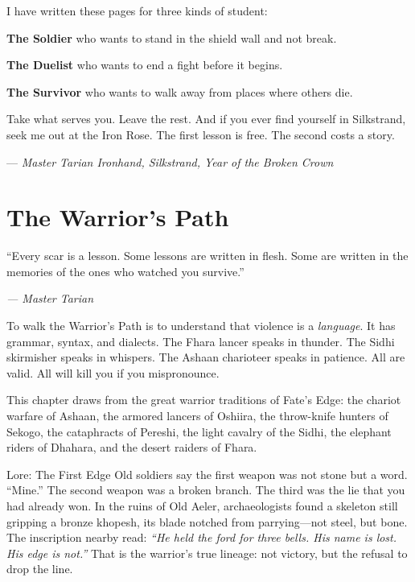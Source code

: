 \documentclass[9pt,a5paper]{extbook}
\begin{document}
I have written these pages for three kinds of student:

\noindent\textbf{The Soldier} who wants to stand in the shield wall and not break.

\noindent\textbf{The Duelist} who wants to end a fight before it begins.

\noindent\textbf{The Survivor} who wants to walk away from places where others die.

Take what serves you. Leave the rest. And if you ever find yourself in Silkstrand, seek me out at the Iron Rose. The first lesson is free. The second costs a story.

\vspace{0.5cm}
\hfill --- \textit{Master Tarian Ironhand, Silkstrand, Year of the Broken Crown}

\clearpage

\tableofcontents
\clearpage

\mainmatter


\chapter{The Warrior's Path}
\epigraph{``Every scar is a lesson. Some lessons are written in flesh. Some are written in the memories of the ones who watched you survive.''}{\textit{--- Master Tarian}}

To walk the Warrior's Path is to understand that violence is a \textit{language}. It has grammar, syntax, and dialects. The Fhara lancer speaks in thunder. The Sidhi skirmisher speaks in whispers. The Ashaan charioteer speaks in patience. All are valid. All will kill you if you mispronounce.

This chapter draws from the great warrior traditions of Fate's Edge: the chariot warfare of Ashaan, the armored lancers of Oshiira, the throw-knife hunters of Sekogo, the cataphracts of Pereshi, the light cavalry of the Sidhi, the elephant riders of Dhahara, and the desert raiders of Fhara.

\begin{warriorbox}{Lore: The First Edge}
Old soldiers say the first weapon was not stone but a word. ``Mine.'' The second weapon was a broken branch. The third was the lie that you had already won. In the ruins of Old Aeler, archaeologists found a skeleton still gripping a bronze khopesh, its blade notched from parrying---not steel, but bone. The inscription nearby read: \textit{``He held the ford for three bells. His name is lost. His edge is not.''} That is the warrior's true lineage: not victory, but the refusal to drop the line.
\end{warriorbox}
\end{document}
